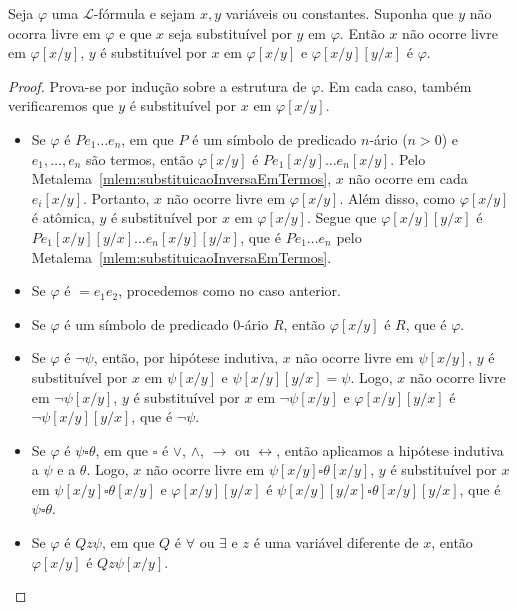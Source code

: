 \begin{metalemma}\label{mlem:substituicaoInversaEmFormulas}
    Seja $\varphi$ uma $\mathcal L$-fórmula e sejam $x, y$ variáveis ou constantes.
    Suponha que $y$ não ocorra livre em $\varphi$ e que $x$ seja substituível por $y$ em $\varphi$.
    Então $x$ não ocorre livre em $\varphi[x/y]$, $y$ é substituível por $x$ em $\varphi[x/y]$ e $\varphi[x/y][y/x]$ é $\varphi$.
\end{metalemma}
\begin{proof}
    Prova-se por indução sobre a estrutura de $\varphi$.
    Em cada caso, também verificaremos que $y$ é substituível por $x$ em $\varphi[x/y]$.

    \begin{itemize}
        \item Se $\varphi$ é $P e_1 \dots e_n$, em que $P$ é um símbolo de predicado $n$-ário ($n>0$) e $e_1, \dots, e_n$ são termos, então $\varphi[x/y]$ é $P e_1[x/y] \dots e_n[x/y]$.
        Pelo Metalema~\ref{mlem:substituicaoInversaEmTermos}, $x$ não ocorre em cada $e_i[x/y]$.
        Portanto, $x$ não ocorre livre em $\varphi[x/y]$.
        Além disso, como $\varphi[x/y]$ é atômica, $y$ é substituível por $x$ em $\varphi[x/y]$.
        Segue que $\varphi[x/y][y/x]$ é $P e_1[x/y][y/x] \dots e_n[x/y][y/x]$, que é $P e_1 \dots e_n$ pelo Metalema~\ref{mlem:substituicaoInversaEmTermos}.
        \item Se $\varphi$ é $= e_1 e_2$, procedemos como no caso anterior.
        \item Se $\varphi$ é um símbolo de predicado 0-ário $R$, então $\varphi[x/y]$ é $R$, que é $\varphi$.
        \item Se $\varphi$ é $\neg \psi$, então, por hipótese indutiva, $x$ não ocorre livre em $\psi[x/y]$, $y$ é substituível por $x$ em $\psi[x/y]$ e $\psi[x/y][y/x]=\psi$.
        Logo, $x$ não ocorre livre em $\neg\psi[x/y]$, $y$ é substituível por $x$ em $\neg\psi[x/y]$ e $\varphi[x/y][y/x]$ é $\neg \psi[x/y][y/x]$, que é $\neg \psi$.
        \item Se $\varphi$ é $\psi \square \theta$, em que $\square$ é $\vee$, $\wedge$, $\rightarrow$ ou $\leftrightarrow$, então aplicamos a hipótese indutiva a $\psi$ e a $\theta$.
        Logo, $x$ não ocorre livre em $\psi[x/y]\square\theta[x/y]$, $y$ é substituível por $x$ em $\psi[x/y]\square\theta[x/y]$ e $\varphi[x/y][y/x]$ é $\psi[x/y][y/x] \square \theta[x/y][y/x]$, que é $\psi \square \theta$.

        \item Se $\varphi$ é $Q z \psi$, em que $Q$ é $\forall$ ou $\exists$ e $z$ é uma variável diferente de $x$, então $\varphi[x/y]$ é $Q z \psi[x/y]$.
        

\end{itemize}
\end{proof}
